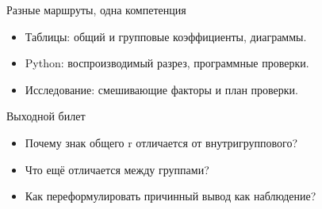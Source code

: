 \documentclass[aspectratio=169,10pt]{beamer}
\begin{document}
\begin{frame}[t]{Разные маршруты, одна компетенция}
\vspace{.15cm}\begin{itemize}
\item Таблицы: общий и групповые коэффициенты, диаграммы.\vspace{6pt}
\item Python: воспроизводимый разрез, программные проверки.\vspace{6pt}
\item Исследование: смешивающие факторы и план проверки.\vspace{6pt}
\end{itemize}
\end{frame}
\begin{frame}[t]{Выходной билет}
\vspace{.15cm}\begin{itemize}
\item Почему знак общего r отличается от внутригруппового?\vspace{6pt}
\item Что ещё отличается между группами?\vspace{6pt}
\item Как переформулировать причинный вывод как наблюдение?\vspace{6pt}
\end{itemize}
\end{frame}
\end{document}
